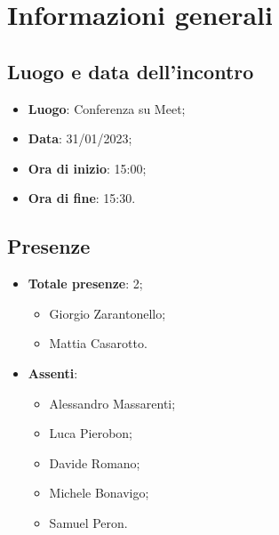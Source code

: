 \section{Informazioni generali}

    \subsection{Luogo e data dell'incontro}
    \begin{itemize}
        \item \textbf{Luogo}: Conferenza su Meet;
        \item \textbf{Data}: 31/01/2023;
        \item \textbf{Ora di inizio}: 15:00;
        \item \textbf{Ora di fine}: 15:30.
    \end{itemize}
    \subsection{Presenze}
    \begin{itemize}
        \item \textbf{Totale presenze}: 2;
        \begin{itemize}
            \item Giorgio Zarantonello;
            \item Mattia Casarotto.
        \end{itemize}
        \item \textbf{Assenti}:
        \begin{itemize}
            \item Alessandro Massarenti;
            \item Luca Pierobon;
            \item Davide Romano;
            \item Michele Bonavigo;
            \item Samuel Peron.
        \end{itemize}
    \end{itemize}